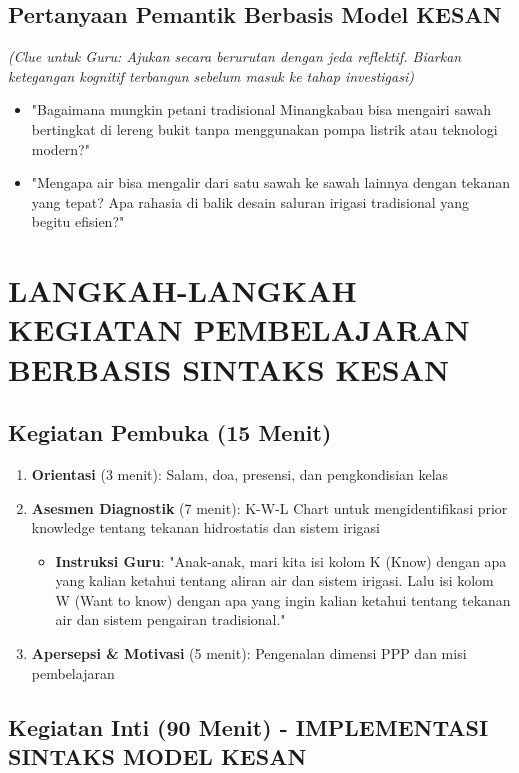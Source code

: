 \documentclass[12pt,a4paper]{article}
\begin{document}
\subsection{Pertanyaan Pemantik Berbasis Model KESAN}
\textit{(Clue untuk Guru: Ajukan secara berurutan dengan jeda reflektif. Biarkan ketegangan kognitif terbangun sebelum masuk ke tahap investigasi)}

\begin{itemize}
\item "Bagaimana mungkin petani tradisional Minangkabau bisa mengairi sawah bertingkat di lereng bukit tanpa menggunakan pompa listrik atau teknologi modern?"
\item "Mengapa air bisa mengalir dari satu sawah ke sawah lainnya dengan tekanan yang tepat? Apa rahasia di balik desain saluran irigasi tradisional yang begitu efisien?"
\end{itemize}

\section{LANGKAH-LANGKAH KEGIATAN PEMBELAJARAN BERBASIS SINTAKS KESAN}

\subsection{Kegiatan Pembuka (15 Menit)}

\begin{enumerate}
\item \textbf{Orientasi} (3 menit): Salam, doa, presensi, dan pengkondisian kelas
\item \textbf{Asesmen Diagnostik} (7 menit): K-W-L Chart untuk mengidentifikasi prior knowledge tentang tekanan hidrostatis dan sistem irigasi
   \begin{itemize}
   \item \textbf{Instruksi Guru}: "Anak-anak, mari kita isi kolom K (Know) dengan apa yang kalian ketahui tentang aliran air dan sistem irigasi. Lalu isi kolom W (Want to know) dengan apa yang ingin kalian ketahui tentang tekanan air dan sistem pengairan tradisional."
   \end{itemize}
\item \textbf{Apersepsi \& Motivasi} (5 menit): Pengenalan dimensi PPP dan misi pembelajaran
\end{enumerate}

\subsection{Kegiatan Inti (90 Menit) - IMPLEMENTASI SINTAKS MODEL KESAN}
\end{document}
